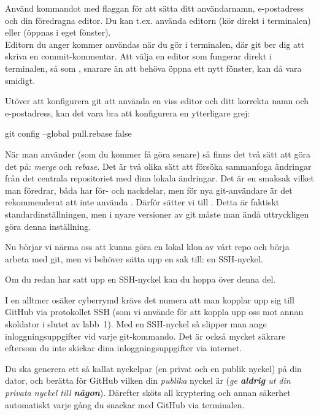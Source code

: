 \begin{Datorarbete}
	\code{[\ref{git-config}]} Använd kommandot  med flaggan  för att sätta ditt användarnamn, e-postadress och din föredragna editor. Du kan t.ex. använda editorn  (kör direkt i terminalen) eller  (öppnas i eget fönster).
	\\

	Editorn du anger kommer användas när du gör  i terminalen, där git ber dig att skriva en commit-kommentar. Att välja en editor som fungerar direkt i terminalen, så som , snarare än att behöva öppna ett nytt fönster, kan då vara smidigt.

	\item Utöver att konfigurera git att använda en viss editor och ditt korrekta namn och e-postadress, kan det vara bra att konfigurera en ytterligare grej:
	\begin{Code}
		git config --global pull.rebase false
	\end{Code}
	När man använder  (som du kommer få göra senare) så finns det två sätt att göra det på: \emph{merge} och \emph{rebase}. Det är två olika sätt att försöka sammanfoga ändringar från det centrala repositoriet med dina lokala ändringar. Det är en smaksak vilket man föredrar, båda har för- och nackdelar, men för nya git-användare är det rekommenderat att inte använda . Därför sätter vi  till . Detta är faktiskt standardinställningen, men i nyare versioner av git måste man ändå uttryckligen göra denna inställning.

	\item Nu börjar vi närma oss att kunna göra en lokal klon av vårt repo och börja arbeta med git, men vi behöver sätta upp en sak till: en SSH-nyckel.

	\halfblankline
	Om du redan har satt upp en SSH-nyckel kan du hoppa över denna del.
	\halfblankline

	\noindent I en alltmer osäker cyberrymd krävs det numera att man kopplar upp sig till GitHub via protokollet SSH (som vi använde för att koppla upp oss mot annan skoldator i slutet av labb~1). Med en SSH-nyckel så slipper man ange inloggningsuppgifter vid varje git-kommando. Det är också mycket säkrare eftersom du inte skickar dina inloggningsuppgifter via internet.

	Du ska generera ett så kallat nyckelpar (en privat och en publik nyckel) på din dator, och berätta för GitHub vilken din \emph{publika} nyckel är (\emph{ge \textbf{aldrig} ut din privata nyckel till \textbf{någon}}). Därefter sköts all kryptering och annan säkerhet automatiskt varje gång du snackar med GitHub via terminalen.



\end{Datorarbete}
